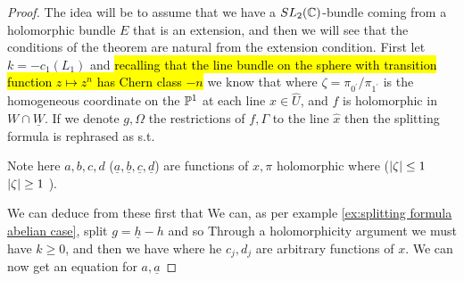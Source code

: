 \documentclass{article}
\begin{document}
\begin{proof}
	The idea will be to assume that we have a $SL_2(\mathbb{C})$-bundle coming from a holomorphic bundle $E$ that is an extension, and then we will see that the conditions of the theorem are natural from the extension condition. First let $k = -c_1(L_1)$ and \hl{recalling that the line bundle on the sphere with transition function $z \mapsto z^n$ has Chern class $-n$} we know that 
	where $\zeta = \pi_{0^\prime}/\pi_{1^\prime}$ is the homogeneous coordinate on the $\mathbb{P}^1$ at each line $\hat{x} \in \hat{U}$, and $f$ is holomorphic in $W \cap \underline{W}$. If we denote $g,\Omega$ the restrictions of $f,\Gamma$ to the line $\hat{x}$ then the splitting formula is rephrased as 
	s.t. 
\begin{remark}
	Note here $a,b,c,d$ ($\underline{a},\underline{b},\underline{c},\underline{d}$) are functions of $x,\pi$ holomorphic where ($\left\lvert \zeta \right\rvert\leq 1$ $\left\lvert \zeta \right\rvert\geq1$ ).
\end{remark}
We can deduce from these first that 
We can, as per example \ref{ex:splitting formula abelian case}, split $g=\underline{h}-h$ and so 
Through a holomorphicity argument we must have $k\geq 0$, and then we have 
where he $c_j,d_j$ are arbitrary functions of $x$. We can now get an equation for $a,\underline{a}$ 
\end{proof}
\end{document}
